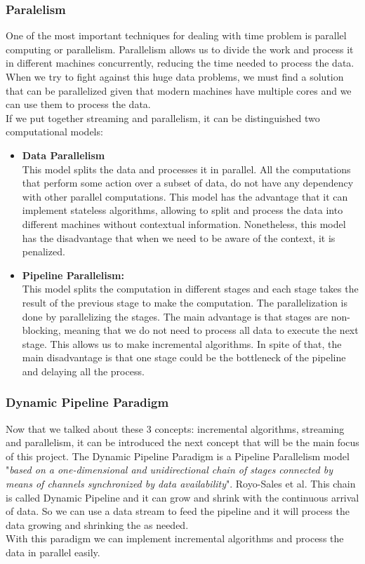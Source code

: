 \subsubsection*{Paralelism}
One of the most important techniques for dealing with time problem is parallel computing or parallelism.
Parallelism allows us to divide the work and process it in different machines concurrently, reducing the time needed to process the data.
When we try to fight against this huge data problems, we must find a solution that can be parallelized given that modern machines have multiple cores and we can use them to process the data.\\
If we put together streaming and parallelism, it can be distinguished two computational models:
\begin{itemize}
    \item \textbf{Data Parallelism} \\ 
        This model splits the data and processes it in parallel.
        All the computations that perform some action over a subset of data, do not have any dependency with other parallel computations.
        This model has the advantage that it can implement stateless algorithms, allowing to split and process the data into different machines without contextual information.
        Nonetheless, this model has the disadvantage that when we need to be aware of the context, it is penalized.
    \item \textbf{Pipeline Parallelism:} \\
        This model splits the computation in different stages and each stage takes the result of the previous stage to make the computation.
        The parallelization is done by parallelizing the stages.
        The main advantage is that stages are non-blocking, meaning that we do not need to process all data to execute the next stage.
        This allows us to make incremental algorithms.
        In spite of that, the main disadvantage is that one stage could be the bottleneck of the pipeline and delaying all the process.
    \end{itemize}
\subsubsection*{Dynamic Pipeline Paradigm}
Now that we talked about these 3 concepts: incremental algorithms, streaming and parallelism, it can be introduced the next concept that will be the main focus of this project.
The Dynamic Pipeline Paradigm is a Pipeline Parallelism model "\textit{based on a one-dimensional and unidirectional chain of stages connected by means of channels synchronized by data availability}". Royo-Sales et al. \cite[][Page 9, 2.2]{royo_sales_algorithm_2021}
This chain is called Dynamic Pipeline and it can grow and shrink with the continuous arrival of data.
So we can use a data stream to feed the pipeline and it will process the data growing and shrinking the as needed. \\
With this paradigm we can implement incremental algorithms and process the data in parallel easily.


